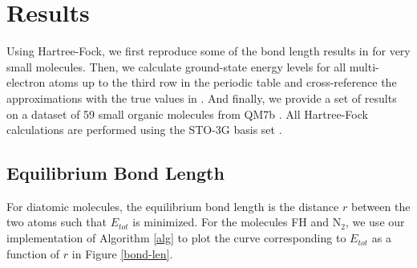 \documentclass[12pt]{article}
\begin{document}
\section{Results}

Using Hartree-Fock, we first reproduce some of the bond length results in \cite{szabo2012} for very small molecules.  Then, we calculate ground-state energy levels for all multi-electron atoms up to the third row in the periodic table and cross-reference the approximations with the true values in \cite{bunge1993roothaan}.  And finally, we provide a set of results on a dataset of 59 small organic molecules from QM7b \cite{montavon2013}.  All Hartree-Fock calculations are performed using the STO-3G basis set \cite{schuchardt2007}.  

\subsection{Equilibrium Bond Length}   
For diatomic molecules, the equilibrium bond length is the distance $r$ between the two atoms such that $E_{tot}$ is minimized.  For the molecules FH and N$_2$, we use our implementation of Algorithm \ref{alg} to plot the curve corresponding to $E_{tot}$ as a function of $r$ in Figure \ref{bond-len}.
\end{document}
